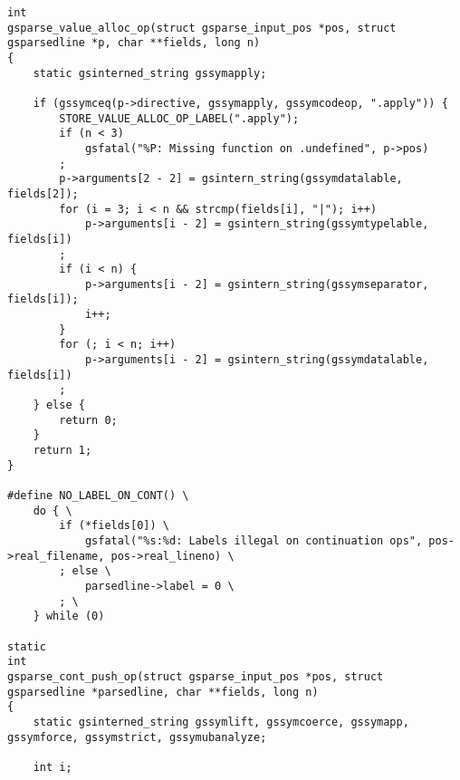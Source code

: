 \documentclass{report}
\begin{document}
\begin{verbatim}
int
gsparse_value_alloc_op(struct gsparse_input_pos *pos, struct gsparsedline *p, char **fields, long n)
{
    static gsinterned_string gssymapply;

    if (gssymceq(p->directive, gssymapply, gssymcodeop, ".apply")) {
        STORE_VALUE_ALLOC_OP_LABEL(".apply");
        if (n < 3)
            gsfatal("%P: Missing function on .undefined", p->pos)
        ;
        p->arguments[2 - 2] = gsintern_string(gssymdatalable, fields[2]);
        for (i = 3; i < n && strcmp(fields[i], "|"); i++)
            p->arguments[i - 2] = gsintern_string(gssymtypelable, fields[i])
        ;
        if (i < n) {
            p->arguments[i - 2] = gsintern_string(gssymseparator, fields[i]);
            i++;
        }
        for (; i < n; i++)
            p->arguments[i - 2] = gsintern_string(gssymdatalable, fields[i])
        ;
    } else {
        return 0;
    }
    return 1;
}

#define NO_LABEL_ON_CONT() \
    do { \
        if (*fields[0]) \
            gsfatal("%s:%d: Labels illegal on continuation ops", pos->real_filename, pos->real_lineno) \
        ; else \
            parsedline->label = 0 \
        ; \
    } while (0)

static
int
gsparse_cont_push_op(struct gsparse_input_pos *pos, struct gsparsedline *parsedline, char **fields, long n)
{
    static gsinterned_string gssymlift, gssymcoerce, gssymapp, gssymforce, gssymstrict, gssymubanalyze;

    int i;


\end{verbatim}
\end{document}

